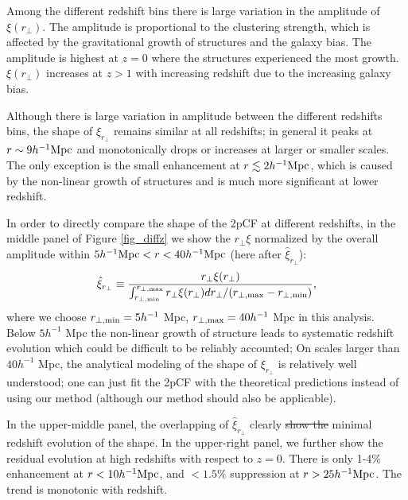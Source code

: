 \documentclass[iop]{emulateapj}
\providecommand{\DIFadd}[1]{{\protect\color{blue}\uwave{#1}}} %
\providecommand{\DIFdel}[1]{{\protect\color{red}\sout{#1}}}                      %
\providecommand{\DIFaddbegin}{} %
\providecommand{\DIFaddend}{} %
\providecommand{\DIFdelbegin}{} %
\providecommand{\DIFdelend}{} %
\begin{document}
Among the different redshift bins there is large variation in the amplitude of $\xi(r_\perp)$.
The amplitude is proportional to the clustering strength, which is affected by the gravitational growth of structures and the galaxy bias.
The amplitude is highest at $z=0$ where the structures experienced the most growth.
$\xi(r_\perp)$ increases at $z>1$ with increasing redshift 
due to the increasing galaxy bias.

Although there is large variation in amplitude between the different redshifts bins, 
the shape of $\xi_{r_{\perp}}$  remains similar at all redshifts;
in general it peaks at $r\sim9 h^{-1}\rm Mpc$ and monotonically drops or increases at larger or smaller scales.
The only exception is the small enhancement at $r\lesssim 2 h^{-1}\rm Mpc$,
which is caused by the non-linear growth of structures 
and is much more significant at lower redshift.

In order to directly compare the shape of the 2pCF at different redshifts,
in the middle panel of Figure \ref{fig_diffz} 
we show the $r_\perp\xi$ normalized by the overall amplitude within 
$5h^{-1}{\rm Mpc} < r < 40h^{-1}{\rm Mpc}$
(here after $\hat \xi_{r_\perp}$):
\begin{equation}
 \hat \xi_{ r_\perp} \equiv  \frac{ {r_\perp\xi}(r_{\perp})}{ \int_{r_{\perp, \rm min}}^{r_{\perp, \rm max}}r_{\perp} \xi(r_{\perp}) d r_{\perp} / (r_{\perp,\rm max}-r_{\perp,\rm min}) },
\end{equation}
where we choose $r_{\perp, \rm min}=5 h^{-1}$ Mpc, $r_{\perp, \rm max}=40 h^{-1}$ Mpc in this analysis.
Below $5 h^{-1}$ Mpc the non-linear growth of structure 
leads to systematic redshift evolution which could be difficult to be reliably accounted;
On scales larger than $40 h^{-1}$ Mpc,
the analytical modeling of the shape of $\xi_{r_{\perp}}$ is relatively well understood;
one can just fit the 2pCF with the theoretical predictions \citep{BCGS2001,Salvador2014,Salvador2016} 
instead of using our method 
(although our method should also be applicable).

In the upper-middle panel, the overlapping of $\hat\xi_{r_{\perp}}$
clearly \DIFdelbegin \DIFdel{show the }\DIFdelend \DIFaddbegin \DIFadd{shows that there is }\DIFaddend minimal redshift evolution of the shape.
In the upper-right panel, 
we further show the residual evolution at high redshifts 
with respect to $z=0$.
There is only 1-4\% enhancement 
at $r<10h^{-1}\rm Mpc$,
and $<1.5\%$ suppression at $r>25 h^{-1}\rm Mpc$.
The trend is monotonic with redshift.
\end{document}
